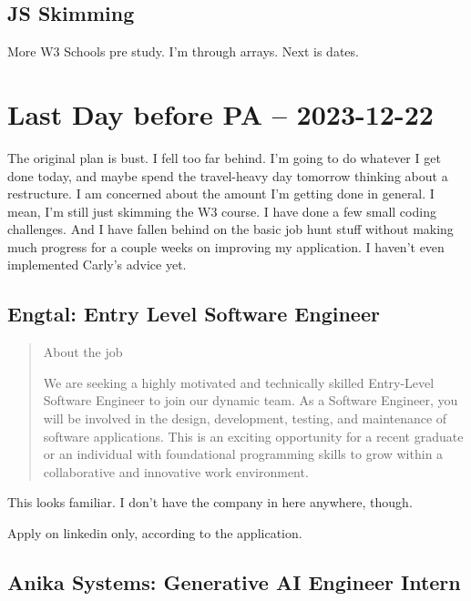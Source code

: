 \documentclass[
	letterpaper, %
	12pt, %
]{CSSullivanBusinessReport}
\begin{document}

\subsection[JS]{JS Skimming}

More W3 Schools pre study. I'm through arrays. Next is dates.


\section[22 Dec: Last Day before PA]{Last Day before PA -- 2023-12-22} %

The original plan is bust. I fell too far behind. I'm going to do whatever I get done today, and maybe spend the travel-heavy day tomorrow thinking about a restructure. I am concerned about the amount I'm getting done in general. I mean, I'm still just skimming the W3 course. I have done a few small coding challenges. And I have fallen behind on the basic job hunt stuff without making much progress for a couple weeks on improving my application. I haven't even implemented Carly's advice yet.


\subsection[Engtal]{Engtal: Entry Level Software Engineer}

\begin{quote}
	About the job
	
	We are seeking a highly motivated and technically skilled Entry-Level Software Engineer to join our dynamic team. As a Software Engineer, you will be involved in the design, development, testing, and maintenance of software applications. This is an exciting opportunity for a recent graduate or an individual with foundational programming skills to grow within a collaborative and innovative work environment.

\end{quote}

This looks familiar. I don't have the company in here anywhere, though.

Apply on linkedin only, according to the application.


\subsection[Anika Systems]{Anika Systems: Generative AI Engineer Intern}
\end{document}
